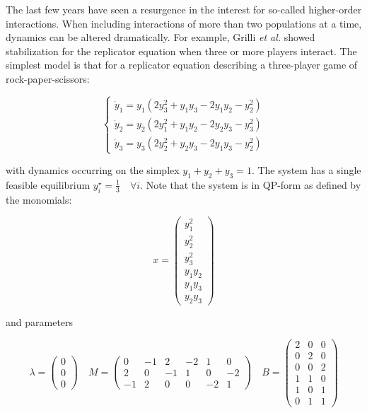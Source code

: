 \documentclass{article}
\begin{document}
\label{sec:hoi}

The last few years have seen a resurgence in the interest for so-called
higher-order interactions. When including interactions of more than two
populations at a time, dynamics can be altered dramatically. For
example, Grilli \textit{et al.} showed stabilization for the replicator
equation when three or more players interact. The simplest model is that
for a replicator equation describing a three-player game of
rock-paper-scissors:

\begin{equation}
\label{eq:rpshoi}
\begin{cases}
\dot{y}_1 = y_1 (2 y_3^2 + y_1 y_3 - 2 y_1 y_2 - y_2^2)\\
\dot{y}_2 = y_2 (2 y_1^2 + y_1 y_2 - 2 y_2 y_3 - y_3^2)\\
\dot{y}_3 = y_3 (2 y_2^2 + y_2 y_3 - 2 y_1 y_3 - y_2^2)
\end{cases}
\end{equation}

with dynamics occurring on the simplex \(y_1 + y_2 + y_3 = 1\). The
system has a single feasible equilibrium
\(y_i^\star = \frac{1}{3} \quad \forall i\). Note that the system is in
QP-form as defined by the monomials:

\begin{equation}
\label{eq:rpshoimon}
x = 
\begin{pmatrix}
y_1^2\\ y_2^2 \\ y_3^2 \\ y_1 y_2 \\ y_1 y_3 \\ y_2 y_3
\end{pmatrix} 
\end{equation}

and parameters

\begin{equation}
\label{eq:rpshoiqp}
\lambda = \begin{pmatrix}
0\\
0\\
0
\end{pmatrix} \quad 
M = \begin{pmatrix}
0 & -1 & 2 & -2 & 1 & 0\\
2 & 0 & -1 & 1 & 0 & -2\\
-1 & 2 & 0 & 0 & -2 & 1
\end{pmatrix} \quad
B = \begin{pmatrix}
2 & 0 & 0 \\
0 & 2 & 0 \\
0 & 0 & 2 \\
1 & 1 & 0 \\
1 & 0 & 1 \\
0 & 1 & 1
\end{pmatrix}
\end{equation}
\end{document}

